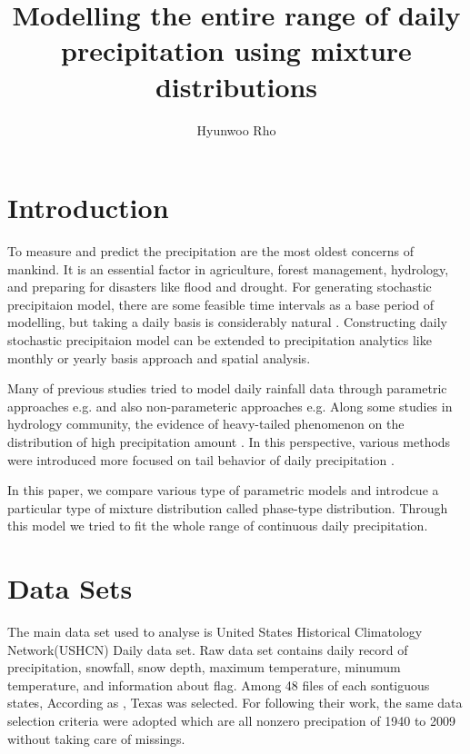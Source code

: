 \documentclass[12pt]{article}\usepackage[]{graphicx}\usepackage[]{color}
\begin{document}
\title{Modelling the entire range of daily precipitation using mixture distributions}
\author{Hyunwoo Rho}
\date{}

\maketitle


\section{Introduction}


To measure and predict the precipitation are the most oldest concerns of mankind. It is an essential factor in agriculture, forest management, hydrology, and preparing for disasters like flood and drought. For generating stochastic precipitaion model, there are some feasible time intervals as a base period of modelling, but taking a daily basis is considerably natural \cite{richardson1981stochastic}. Constructing daily stochastic precipitaion model can be extended to precipitation analytics like monthly or yearly basis approach and spatial analysis. 


Many of previous studies tried to model daily rainfall data through parametric approaches e.g. \cite{ison1971wet, mielke1973three, richardson1981stochastic, stern1984model} and also non-parameteric approaches e.g. \cite{sharma1999nonparametric, harrold2003nonparametric}Along some studies in hydrology community, the evidence of heavy-tailed phenomenon on the distribution of high precipitation amount \cite{koutsoyiannis2004statistics}. In this perspective, various methods were introduced more focused on tail behavior of daily precipitation \cite{furrer2008improving, li2012simulation, papalexiou2012entropy, papalexiou2013extreme}. 


In this paper, we compare various type of parametric models and introdcue a particular type of mixture distribution called phase-type distribution. Through this model we tried to fit the whole range of continuous daily precipitation.


\section{Data Sets}


The main data set used to analyse is United States Historical Climatology Network(USHCN) Daily data set. Raw data set contains daily record of precipitation, snowfall, snow depth, maximum temperature, minumum temperature, and information about flag. Among 48 files of each sontiguous states, According as \cite{li2012simulation}, Texas was selected. For following their work, the same data selection criteria were adopted which are all nonzero precipation of 1940 to 2009 without taking care of missings. 
\end{document}
